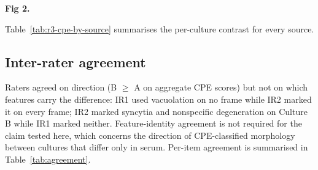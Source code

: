 \textbf{Fig 2.} 

Table~\ref{tab:r3-cpe-by-source} summarises the per-culture contrast for every source.



\subsection*{Inter-rater agreement}
Raters agreed on direction (B $\geq$ A on aggregate CPE scores) but not on which features carry the difference: IR1 used vacuolation on no frame while IR2 marked it on every frame; IR2 marked syncytia and nonspecific degeneration on Culture B while IR1 marked neither. Feature-identity agreement is not required for the claim tested here, which concerns the direction of CPE-classified morphology between cultures that differ only in serum. Per-item agreement is summarised in Table~\ref{tab:agreement}.


